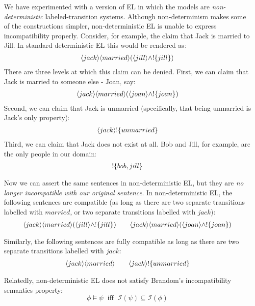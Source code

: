 We have experimented with a version of EL in which the models are
\emph{non-deterministic} labeled-transition systems.  Although
non-determinism makes some of the constructions simpler,
non-deterministic EL is unable to express incompatibility properly.
Consider, for example, the claim that Jack is married to Jill. 
In standard deterministic EL this would be rendered as:
\begin{eqnarray*}
  \langle jack \rangle \langle married \rangle (\langle jill \rangle \land ! \{jill\})
\end{eqnarray*}
There are three levels at which this claim can be denied.
First, we can claim that Jack is married to someone else - Joan, say:
\begin{eqnarray*}
   \langle jack \rangle \langle married \rangle (\langle joan \rangle \land ! \{joan\})
\end{eqnarray*}
Second, we can claim that Jack is unmarried (specifically, that being unmarried is Jack's only property):
\begin{eqnarray*}
  \langle jack \rangle !\{unmarried\}
\end{eqnarray*}
Third, we can claim that Jack does not exist at all. Bob and Jill, for example, are the only people in our domain:
\begin{eqnarray*}
  ! \{bob, jill\}
\end{eqnarray*}

Now we can assert the same sentences in non-deterministic EL, but they
are \emph{no longer incompatible with our original sentence}.  In
non-deterministic EL, the following sentences are compatible (as long
as there are two separate transitions labelled with $married$, or two
separate transitions labelled with $jack$):
\begin{eqnarray*}
  \langle jack \rangle \langle married \rangle (\langle jill \rangle \land ! \{jill\}) 
      \qquad
  \langle jack \rangle \langle married \rangle (\langle joan \rangle \land ! \{joan\})
\end{eqnarray*}

\NI Similarly, the following sentences are fully compatible as long as
there are two separate transitions labelled with $jack$:
\begin{eqnarray*}
  \langle jack \rangle \langle married \rangle \qquad
  \langle jack \rangle ! \{unmarried\}
\end{eqnarray*}

\NI Relatedly, non-deterministic EL does not satisfy Brandom's
incompatibility semantics property:
\[
   \phi \models \psi \; \mbox{ iff } \; \mathcal{I}(\psi) \subseteq \mathcal{I}(\phi)
\]


